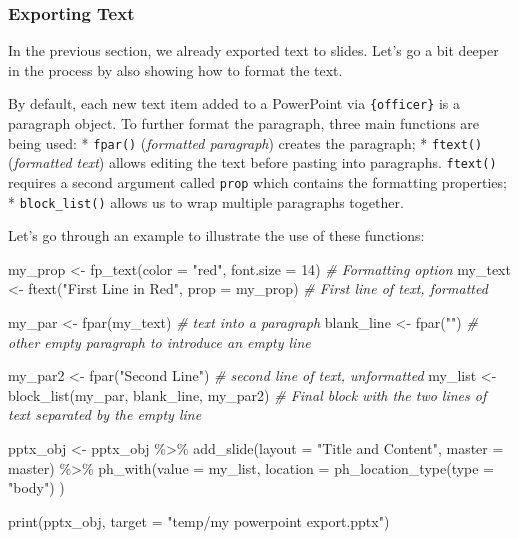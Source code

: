 \documentclass[
]{book}
\newenvironment{Shaded}{\begin{snugshade}}{\end{snugshade}}
\newcommand{\AttributeTok}[1]{\textcolor[rgb]{0.77,0.63,0.00}{#1}}
\newcommand{\CommentTok}[1]{\textcolor[rgb]{0.56,0.35,0.01}{\textit{#1}}}
\newcommand{\DecValTok}[1]{\textcolor[rgb]{0.00,0.00,0.81}{#1}}
\newcommand{\FunctionTok}[1]{\textcolor[rgb]{0.00,0.00,0.00}{#1}}
\newcommand{\NormalTok}[1]{#1}
\newcommand{\OtherTok}[1]{\textcolor[rgb]{0.56,0.35,0.01}{#1}}
\newcommand{\SpecialCharTok}[1]{\textcolor[rgb]{0.00,0.00,0.00}{#1}}
\newcommand{\StringTok}[1]{\textcolor[rgb]{0.31,0.60,0.02}{#1}}
\begin{document}
\hypertarget{exporting-text}{%
\subsubsection{Exporting Text}\label{exporting-text}}

In the previous section, we already exported text to slides. Let's go a bit deeper in the process by also showing how to format the text.

By default, each new text item added to a PowerPoint via \texttt{\{officer\}} is a paragraph object. To further format the paragraph, three main functions are being used:
* \texttt{fpar()} (\emph{formatted paragraph}) creates the paragraph;
* \texttt{ftext()} (\emph{formatted text}) allows editing the text before pasting into paragraphs. \texttt{ftext()} requires a second argument called \texttt{prop} which contains the formatting properties;
* \texttt{block\_list()} allows us to wrap multiple paragraphs together.

Let's go through an example to illustrate the use of these functions:

\begin{Shaded}
\begin{Highlighting}[]
\NormalTok{my\_prop }\OtherTok{\textless{}{-}} \FunctionTok{fp\_text}\NormalTok{(}\AttributeTok{color =} \StringTok{"red"}\NormalTok{, }\AttributeTok{font.size =} \DecValTok{14}\NormalTok{) }\CommentTok{\# Formatting option}
\NormalTok{my\_text }\OtherTok{\textless{}{-}} \FunctionTok{ftext}\NormalTok{(}\StringTok{"First Line in Red"}\NormalTok{, }\AttributeTok{prop =}\NormalTok{ my\_prop) }\CommentTok{\# First line of text, formatted}

\NormalTok{my\_par }\OtherTok{\textless{}{-}} \FunctionTok{fpar}\NormalTok{(my\_text) }\CommentTok{\# text into a paragraph}
\NormalTok{blank\_line }\OtherTok{\textless{}{-}} \FunctionTok{fpar}\NormalTok{(}\StringTok{""}\NormalTok{) }\CommentTok{\# other empty paragraph to introduce an empty line}

\NormalTok{my\_par2 }\OtherTok{\textless{}{-}} \FunctionTok{fpar}\NormalTok{(}\StringTok{"Second Line"}\NormalTok{) }\CommentTok{\# second line of text, unformatted}
\NormalTok{my\_list }\OtherTok{\textless{}{-}} \FunctionTok{block\_list}\NormalTok{(my\_par, blank\_line, my\_par2) }\CommentTok{\# Final block with the two lines of text separated by the empty line}

\NormalTok{pptx\_obj }\OtherTok{\textless{}{-}}\NormalTok{ pptx\_obj }\SpecialCharTok{\%\textgreater{}\%}
  \FunctionTok{add\_slide}\NormalTok{(}\AttributeTok{layout =} \StringTok{"Title and Content"}\NormalTok{, }\AttributeTok{master =}\NormalTok{ master) }\SpecialCharTok{\%\textgreater{}\%} 
  \FunctionTok{ph\_with}\NormalTok{(}\AttributeTok{value =}\NormalTok{ my\_list, }\AttributeTok{location =} \FunctionTok{ph\_location\_type}\NormalTok{(}\AttributeTok{type =} \StringTok{"body"}\NormalTok{) )}

\FunctionTok{print}\NormalTok{(pptx\_obj, }\AttributeTok{target =} \StringTok{"temp/my powerpoint export.pptx"}\NormalTok{)}
\end{Highlighting}
\end{Shaded}
\end{document}
